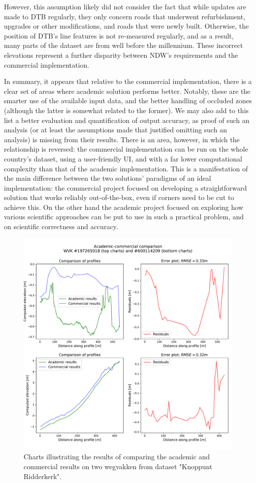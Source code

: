 However, this assumption likely did not consider the fact that while updates are made to DTB regularly, they only concern roads that underwent refurbishment, upgrades or other modifications, and roads that were newly built. Otherwise, the position of DTB's line features is not re-measured regularly, and as a result, many parts of the dataset are from well before the millennium. These incorrect elevations represent a further disparity between NDW's requirements and the commercial implementation.

In summary, it appears that relative to the commercial implementation, there is a clear set of areas where academic solution performs better. Notably, these are the smarter use of the available input data, and the better handling of occluded zones (although the latter is somewhat related to the former). We may also add to this list a better evaluation and quantification of output accuracy, as proof of such an analysis (or at least the assumptions made that justified omitting such an analysis) is missing from their results. There is an area, however, in which the relationship is reversed: the commercial implementation can be run on the whole country's dataset, using a user-friendly UI, and with a far lower computational complexity than that of the academic implementation. This is a manifestation of the main difference between the two solutions' paradigms of an ideal implementation: the commercial project focused on developing a straightforward solution that works reliably out-of-the-box, even if corners need to be cut to achieve this. On the other hand the academic project focused on exploring how various scientific approaches can be put to use in such a practical problem, and on scientific correctness and accuracy.

\begin{figure}
    \centering
    \includegraphics[width=0.9\linewidth]{final_report/figs/commercialcomparison2.pdf}
    \caption{Charts illustrating the results of comparing the academic and commercial results on two wegvakken from dataset "Knoppunt Ridderkerk".}
    \label{fig:commercialcomparison2}
\end{figure}

